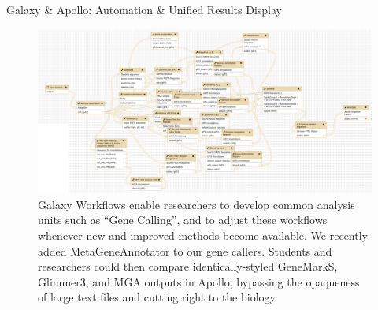 \documentclass[final,t,20pt]{beamer}
\begin{document}
\begin{frame}[fragile]
\begin{columns}[t]
\begin{column}{.60\linewidth}
\begin{block}{Galaxy \& Apollo: Automation \& Unified Results Display }
                \begin{figure}
                    \includegraphics[width=\textwidth]{./media/workflow.png}
                    \caption{Galaxy Workflows enable researchers to develop
                    common analysis units such as ``Gene Calling'', and to
                    adjust these workflows whenever new and improved methods
                    become available. We recently added MetaGeneAnnotator to our
                    gene callers. Students and researchers could then
                    compare identically-styled GeneMarkS, Glimmer3, and MGA
                    outputs in Apollo, bypassing the opaqueness of large text
                    files and cutting right to the biology.}
                \end{figure}
            \end{block}
        \end{column}
  \end{columns}
\end{frame}
\end{document}
